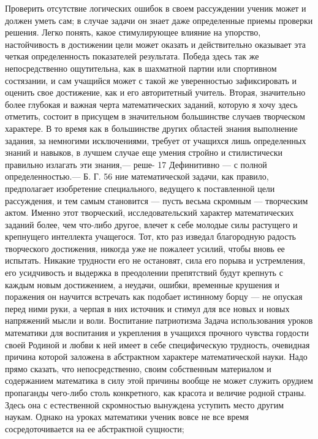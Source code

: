 \documentclass[12pt, a4paper, openany]{book}
\begin{document}
Проверить отсутствие логических ошибок в своем рассуждении 
ученик может и должен уметь сам; в случае задачи он 
знает даже определенные приемы проверки решения. 
Легко понять, какое стимулирующее влияние на упорство, 
настойчивость в достижении цели может оказать и  
действительно оказывает эта четкая определенность  
показателей результата. Победа здесь так же непосредственно 
ощутительна, как в шахматной партии или спортивном 
состязании, и сам учащийся может с такой же уверенностью 
зафиксировать и оценить свое достижение, как и его  
авторитетный учитель. 
Вторая, значительно более глубокая и важная черта 
математических заданий, которую я хочу здесь отметить, 
состоит в присущем в значительном большинстве случаев 
творческом характере. В то время как в большинстве  
других областей знания выполнение задания, за немногими 
исключениями, требует от учащихся лишь определенных 
знаний и навыков, в лучшем случае еще умения стройно 
и стилистически правильно излагать эти знания,— реше- 
17 Дефинитивно — с полной определенностью.— Б. Г. 
56 
ние математической задачи, как правило, предполагает 
изобретение специального, ведущего к поставленной цели 
рассуждения, и тем самым становится — пусть весьма 
скромным — творческим актом. Именно этот творческий, 
исследовательский характер математических заданий  
более, чем что-либо другое, влечет к себе молодые силы 
растущего и крепнущего интеллекта учащегося. Тот, 
кто раз изведал благородную радость творческого  
достижения, никогда уже не пожалеет усилий, чтобы вновь 
ее испытать. Никакие трудности его не остановят, сила 
его порыва и устремления, его усидчивость и выдержка 
в преодолении препятствий будут крепнуть с каждым  
новым достижением, а неудачи, ошибки, временные  
крушения и поражения он научится встречать как подобает 
истинному борцу — не опуская перед ними руки, а черпая 
в них источник и стимул для все новых и новых  
напряжений мысли и воли. 
Воспитание патриотизма 
Задача использования уроков математики для воспитания 
и укрепления в учащихся прочного чувства гордости 
своей Родиной и любви к ней имеет в себе специфическую 
трудность, очевидная причина которой заложена в  
абстрактном характере математической науки. Надо прямо  
сказать, что непосредственно, своим собственным материалом 
и содержанием математика в силу этой причины вообще 
не может служить орудием пропаганды чего-либо столь 
конкретного, как красота и величие родной страны. Здесь 
она с естественной скромностью вынуждена уступить 
место другим наукам. 
Однако на уроках математики ученик вовсе не все 
время сосредоточивается на ее абстрактной сущности;  
\end{document}
